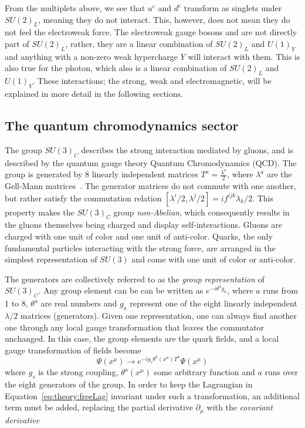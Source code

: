 From the multiplets above, we see that $u^c$ and $d^c$ transform as singlets under $SU(2)_L$, meaning they do not interact. This, however, does not mean they do not feel the electroweak force. The electroweak gauge bosons \PW and \PZ are not directly part of $SU(2)_L$, rather, they are a linear combination of $SU(2)_L$ and $U(1)_Y$ and anything with a non-zero weak hypercharge $Y$ will interact with them. This is also true for the photon, which also is a linear combination of $SU(2)_L$ and $U(1)_Y$. These interactions; the strong, weak and electromagnetic, will be explained in more detail in the following sections.

\subsection{The quantum chromodynamics sector}
\label{sec:theory:qcd}
The group $SU(3)_C$ describes the strong interaction mediated by gluons, and is described by the quantum gauge theory Quantum Chromodynamics (QCD). The group is generated by 8 linearly independent matrices $T^a=\frac{\lambda^a}{2}$, where $\lambda^a$ are the Gell-Mann matrices~\cite{PhysRev.125.1067}. The generator matrices do not commute with one another, but rather satisfy the commutation relation $[\lambda^i/2,\lambda^j/2]=i f^{ijk} \lambda_k/2$. This property makes the $SU(3)_C$ group \emph{non-Abelian}, which consequently results in the gluons themselves being charged and display self-interactions. Gluons are charged with one unit of color and one unit of anti-color. Quarks, the only fundamental particles interacting with the strong force, are arranged in the simplest representation of $SU(3)$ and come with one unit of color or anti-color. \par
The generators are collectively referred to as the \emph{group representation} of $SU(3)_C$. Any group element can be can be written as $e^{-i\theta^a g_a}$, where $a$ runs from 1 to 8, $\theta^a$ are real numbers and $g_a$ represent one of the eight linearly independent $\lambda/2$ matrices (generators). Given one representation, one can always find another one through any local gauge transformation that leaves the commutator unchanged.  
In this case, the group elements are the quark fields, and a local gauge transformation of fields become
\begin{equation}
  \Psi(x^{\mu}) \rightarrow e^{ -i g_s \theta^a(x^{\mu}) T^a}\Psi(x^{\mu})
\end{equation}
where $g_s$ is the strong coupling, $\theta^a(x^{\mu})$ some arbitrary function and $a$ runs over the eight generators of the group. In order to keep the Lagrangian in Equation~\ref{eq:theory:freeLag} invariant under such a transformation, an additional term must be added, replacing the partial derivative $\partial_{\mu}$ with the \emph{covariant derivative}
